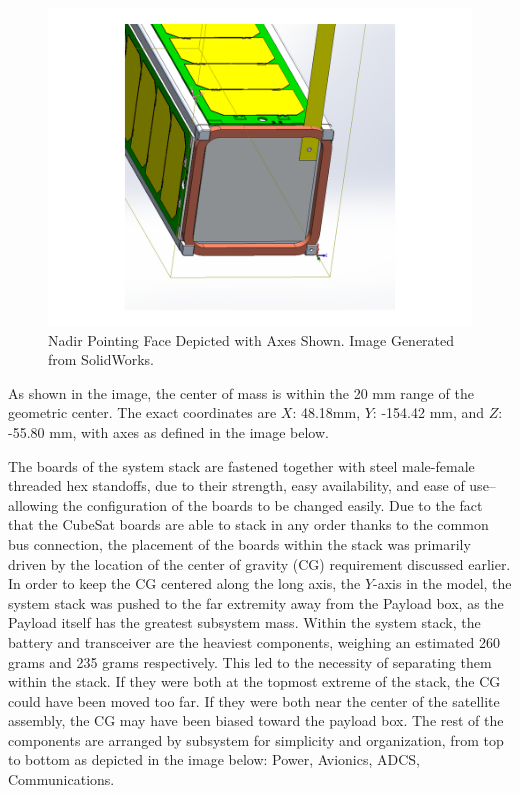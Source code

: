 \documentclass[12pt]{article}
\begin{document}
\begin{figure}[!ht]
\centering
\includegraphics[width=5in]{images/STR-7(2).png}
\caption{Nadir Pointing Face Depicted with Axes Shown. Image Generated from SolidWorks.}
\label{fig:str-7}
\end{figure}


As shown in the image, the center of mass is within the 20 mm range of the geometric center. The exact coordinates are $X$: 48.18mm, $Y$: -154.42 mm, and $Z$: -55.80 mm, with axes as defined in the image below.

The boards of the system stack are fastened together with steel male-female threaded hex standoffs, due to their strength, easy availability, and ease of use--allowing the configuration of the boards to be changed easily. Due to the fact that the CubeSat boards are able to stack in any order thanks to the common bus connection, the placement of the boards within the stack was primarily driven by the location of the center of gravity (CG) requirement discussed earlier. In order to keep the CG centered along the long axis, the $Y$-axis in the model, the system stack was pushed to the far extremity away from the Payload box, as the Payload itself has the greatest subsystem mass. Within the system stack, the battery and transceiver are the heaviest components, weighing an estimated 260 grams and 235 grams respectively. This led to the necessity of separating them within the stack. If they were both at the topmost extreme of the stack, the CG could have been moved too far. If they were both near the center of the satellite assembly, the CG may have been biased toward the payload box.  The rest of the components are arranged by subsystem for simplicity and organization, from top to bottom as depicted in the image below: Power, Avionics, ADCS, Communications.
\end{document}
